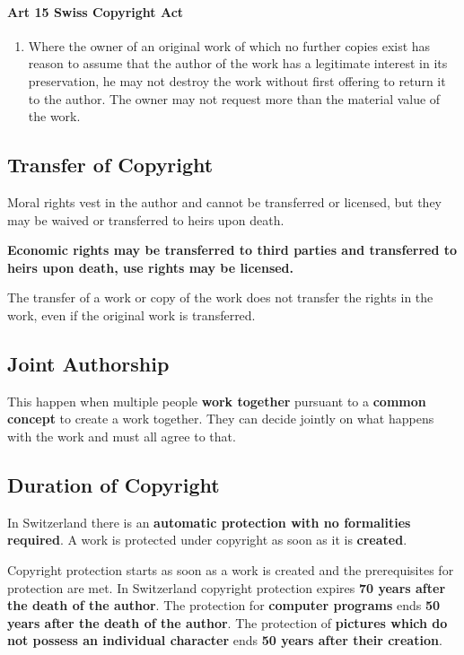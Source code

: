 \documentclass[11pt]{article}
\theoremstyle{definition}
\begin{document}
\paragraph{Art 15 Swiss Copyright Act}
\begin{enumerate}[label=\arabic*]
	\item Where the owner of an original work of which no further copies exist has reason to assume that the author of the work has a legitimate interest in its preservation, he may not destroy the work without first offering to return it to the author. The owner may not request more than the material value of the work.
\end{enumerate}

\subsection{Transfer of Copyright}
Moral rights vest in the author and cannot be transferred or licensed, but they may be waived or transferred to heirs upon death.

\textbf{Economic rights may be transferred to third parties and transferred to heirs upon death, use rights may be licensed.}

The transfer of a work or copy of the work does not transfer the rights in the work, even if the original work is transferred.

\subsection{Joint Authorship}
This happen when multiple people \textbf{work together} pursuant to a \textbf{common concept} to create a work together. They can decide jointly on what happens with the work and must all agree to that.

\subsection{Duration of Copyright}
In Switzerland there is an \textbf{automatic protection with no formalities required}. A work is protected under copyright as soon as it is \textbf{created}.

Copyright protection starts as soon as a work is created and the prerequisites
for protection are met. In Switzerland copyright protection expires \textbf{70 years after the death of the author}. The protection for \textbf{computer programs} ends \textbf{50 years after the death of the author}. The protection of \textbf{pictures which do not possess an individual character} ends \textbf{50 years after their creation}.
\end{document}

